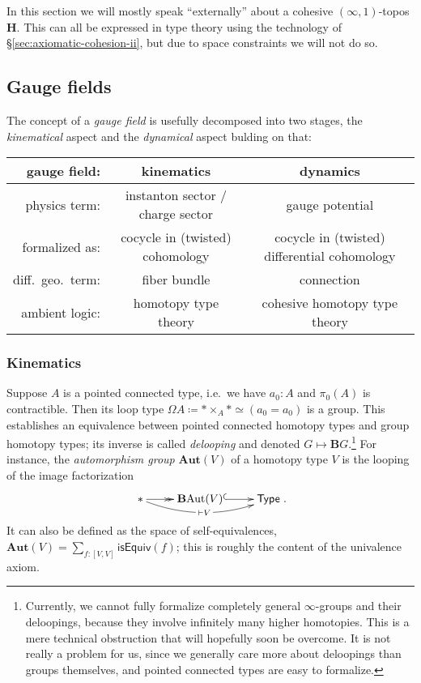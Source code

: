 \documentclass[copyright]{eptcs}
\newcommand{\type}{\ensuremath{\mathsf{Type}}\xspace}
\renewcommand{\H}{\ensuremath{\mathbf{H}}\xspace}
\newcommand{\io}{\ensuremath{(\infty,1)}}
\begin{document}
In this section we will mostly speak ``externally'' about a cohesive \io-topos \H.
This can all be expressed in type theory using the technology of \S\ref{sec:axiomatic-cohesion-ii}, but due to space constraints we will not do so.


\subsection{Gauge fields}

The concept of a \emph{gauge field} is usefully decomposed into two stages, the \emph{kinematical}
aspect and the \emph{dynamical} aspect bulding on that:

\hspace{-.6cm}
\begin{tabular}{|r||c|c|}
  \hline
  {\bf gauge field:} & {\bf kinematics} & {\bf dynamics}
  \\
  \hline
  \hline
  physics  term: &
  instanton sector / charge sector
  & gauge potential
  \\
  \hline
  formalized as: & cocycle in (twisted) cohomology & cocycle in (twisted) differential cohomology
  \\
  \hline
     diff.\ geo.\
     term:
  &
  fiber bundle
  &
  connection
  \\
  \hline
  ambient logic:
  & homotopy type theory & cohesive homotopy type theory
  \\
  \hline
\end{tabular}

\subsubsection{Kinematics}

Suppose $A$ is a pointed connected type, i.e.\ we have $a_0:A$ and $\pi_0(A)$ is contractible.
Then its loop type $\Omega A \coloneqq * \times_A * \simeq (a_0 = a_0)$ is
a group. This establishes an equivalence between pointed connected homotopy types and
group homotopy types; its inverse is called
\emph{delooping} and denoted $G \mapsto \mathbf{B}G$.\footnote{Currently, we cannot fully formalize completely general $\infty$-groups and their deloopings, because they involve infinitely many higher homotopies.  This is a mere technical obstruction that will hopefully soon be overcome.
It is not really a problem for us, since we generally care more about deloopings than groups themselves, and pointed connected types are easy to formalize.}
For instance, the
\emph{automorphism group} $\mathbf{Aut}(V)$ of a homotopy type $V$ is the looping of the image factorization
\[\xymatrix{
    {*} \ar@{->>}[r] \ar@/_1pc/[rr]|{\;\vdash V\;} & \mathbf{B}\mathrm{Aut}(V) \ar@{^{(}->}[r] & \type
  }.\]
It can also be defined as the space of self-equivalences, $\mathbf{Aut}(V) = \sum_{f:[V,V]}\mathsf{isEquiv}(f)$; this is roughly the content of the univalence axiom.
\end{document}
